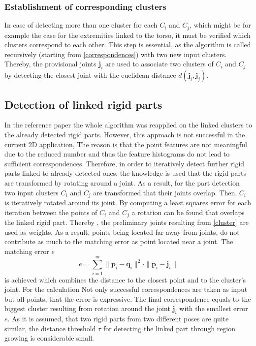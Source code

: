 \subsubsection{Establishment of corresponding clusters}
\label{CorrespondingClusters}
In case of detecting more than one cluster for each $C_i$ and $C_j$, which might be for example the case for the extremities linked to the torso, it must be verified which clusters correspond to each other. This step is essential, as the algorithm is called recursively (starting from \ref{correspondences}) with two new input clusters. Thereby, the provisional joints $\boldsymbol{j}_i$ are used to associate two clusters of $C_i$ and $C_j$ by detecting the closest joint with the euclidean distance $d(\boldsymbol{j}_i,\boldsymbol{j}_j)$.

\subsection{Detection of linked rigid parts}
\label{JointWeights}
In the reference paper the whole algorithm was reapplied on the linked clusters to the already detected rigid parts. However, this approach is not successful in the current 2D application, The reason is that the point features are not meaningful due to the reduced number and thus the feature histograms do not lead to sufficient correspondences. Therefore, in order to iteratively detect further rigid parts linked to already detected ones, the knowledge is used that the rigid parts are transformed by rotating around a joint.
As a result, for the part detection two input clusters $C_i$ and $C_j$ are transformed that their joints overlap. Then, $C_i$ is iteratively rotated around its joint. 
By computing a least squares error for each iteration between the points of $C_i$ and $C_j$ a rotation can be found that overlaps the linked rigid part. Thereby , the preliminary joints resulting from \ref{cluster} are used as weights. As a result, points being located far away from joints, do not contribute as much to the matching error as point located near a joint. The matching error $e$ 
%
\begin{equation}
	e = \displaystyle\sum_{i=1}^{m}\| \boldsymbol{p}_i - \boldsymbol{q}_i\|^2 \cdot \| \boldsymbol{p}_i - \boldsymbol{j}_i\|
\end{equation}
%
is achieved which combines the distance to the closest point and to the cluster's joint. For the calculation Not only successful correspondences are taken as input but all points, that the error is expressive. The final correspondence equals to the biggest cluster resulting from rotation around the joint $\boldsymbol{j}_i$ with the smallest error $e$. As it is assumed, that two rigid parts from two different poses are quite similar, the distance threshold $\tau$ for detecting the linked part through region growing is considerable small.

